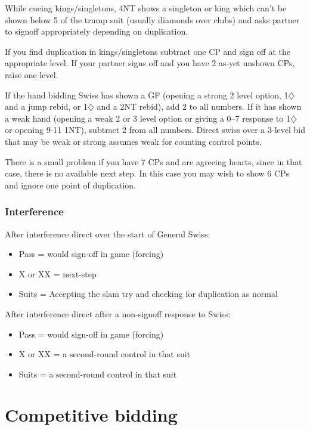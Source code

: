 \documentclass[a4paper,14pt]{extarticle}
\begin{document}
While cueing kings/singletons, 4NT shows a singleton or king which can't be
shown below 5 of the trump suit (usually diamonds over clubs) and asks partner
to signoff appropriately depending on duplication.

If you find duplication in kings/singletons subtract one CP and sign off at the
appropriate level. If your partner signs off and you have 2 as-yet unshown CPs,
raise one level.

If the hand bidding Swiss has shown a GF (opening a strong 2 level option,
1$\diamondsuit$ and a jump rebid, or 1$\diamondsuit$ and a 2NT rebid), add 2 to
all numbers. If it has shown a weak hand (opening a weak 2 or 3 level option or
giving a 0--7 response to 1$\diamondsuit$ or opening 9-11 1NT), subtract 2 from
all numbers. Direct swiss over a 3-level bid that may be weak or strong assumes
weak for counting control points.

There is a small problem if you have 7 CPs and are agreeing hearts, since in
that case, there is no available next step. In this case you may wish to show
6 CPs and ignore one point of duplication.

\subsubsection{Interference}

After interference direct over the start of General Swiss:

\begin{itemize}
	\item Pass = would sign-off in game (forcing)
	\item X or XX = next-step
	\item Suits = Accepting the slam try and checking for duplication as normal
\end{itemize}

After interference direct after a non-signoff response to Swiss:

\begin{itemize}
	\item Pass = would sign-off in game (forcing)
	\item X or XX = a second-round control in that suit
	\item Suits = a second-round control in that suit
\end{itemize}

\newpage

\section{Competitive bidding}
\label{sec:competitive}
\end{document}
